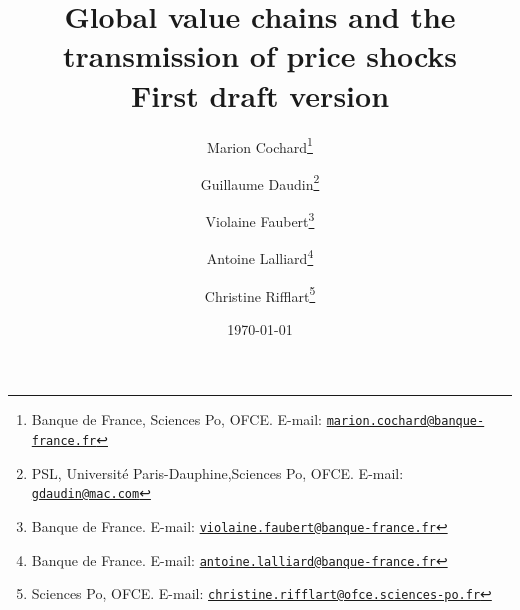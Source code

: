 \documentclass[11pt,a4paper]{article}
\newcommand{\email}[1]{\href{mailto:#1}{\nolinkurl{#1}}}
\begin{document}
\title{Global value chains and the transmission of price shocks\\
\vspace{1cm}
\normalsize{First draft version}
}
\vspace{1cm}

\date{\today}



\author{Marion Cochard\thanks{Banque de France, Sciences Po, OFCE. E-mail: \email{marion.cochard@banque-france.fr}}\and Guillaume Daudin\thanks{PSL, Universit\'e Paris-Dauphine,Sciences Po, OFCE. E-mail: \email{gdaudin@mac.com}}\and Violaine Faubert\thanks{Banque de France. E-mail: \email{violaine.faubert@banque-france.fr}} \and Antoine Lalliard\thanks{Banque de France. E-mail: \email{antoine.lalliard@banque-france.fr}} \and Christine Rifflart\thanks{Sciences Po, OFCE. E-mail: \email{christine.rifflart@ofce.sciences-po.fr}}
}



\maketitle
\end{document}
